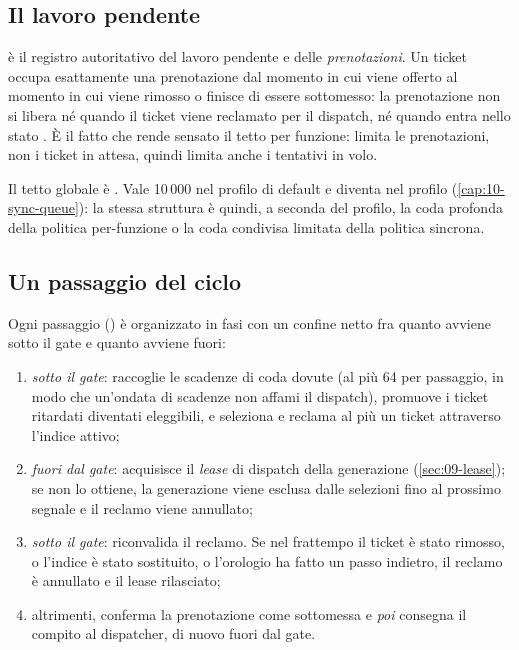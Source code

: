 \subsection{Il lavoro pendente}

 \`e il registro autoritativo del lavoro pendente e delle
\emph{prenotazioni}. Un ticket occupa esattamente una prenotazione dal momento in
cui viene offerto al momento in cui viene rimosso o finisce di essere sottomesso: la
prenotazione non si libera n\'e quando il ticket viene reclamato per il dispatch,
n\'e quando entra nello stato . \`E il fatto che rende sensato il
tetto per funzione:  limita le prenotazioni, non i ticket in
attesa, quindi limita anche i tentativi in volo.

Il tetto globale \`e . Vale 10\,000 nel profilo di default e
diventa  nel profilo 
(\cref{cap:10-sync-queue}): la stessa struttura \`e quindi, a seconda del profilo,
la coda profonda della politica per-funzione o la coda condivisa limitata della
politica sincrona.

\subsection{Un passaggio del ciclo}

Ogni passaggio () \`e organizzato in fasi con un confine netto fra
quanto avviene sotto il gate e quanto avviene fuori:

\begin{enumerate}[leftmargin=*]
  \item \emph{sotto il gate}: raccoglie le scadenze di coda dovute (al pi\`u 64 per
  passaggio, in modo che un'ondata di scadenze non affami il dispatch), promuove i
  ticket ritardati diventati eleggibili, e seleziona e reclama al pi\`u un ticket
  attraverso l'indice attivo;
  \item \emph{fuori dal gate}: acquisisce il \emph{lease} di dispatch della
  generazione (\cref{sec:09-lease}); se non lo ottiene, la generazione viene
  esclusa dalle selezioni fino al prossimo segnale e il reclamo viene annullato;
  \item \emph{sotto il gate}: riconvalida il reclamo. Se nel frattempo il ticket \`e
  stato rimosso, o l'indice \`e stato sostituito, o l'orologio ha fatto un passo
  indietro, il reclamo \`e annullato e il lease rilasciato;
  \item altrimenti, conferma la prenotazione come sottomessa e \emph{poi} consegna il
  compito al dispatcher, di nuovo fuori dal gate.
\end{enumerate}

